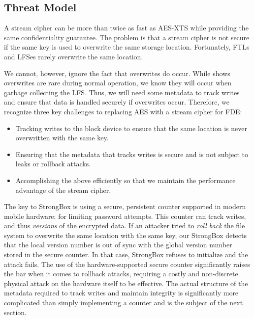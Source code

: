 \subsection{Threat Model}

A stream cipher can be more than twice as fast as AES-XTS while providing the
same confidentiality guarantee. The problem is that a stream cipher is not
secure if the same key is used to overwrite the same storage location.
Fortunately, FTLs and LFSes rarely overwrite the same location.

We cannot, however, ignore the fact that overwrites do occur. While
 shows overwrites are rare during normal operation, we know
they will occur when garbage collecting the LFS. Thus, we will need some
metadata to track writes and ensure that data is handled securely if overwrites
occur. Therefore, we recognize three key challenges to replacing AES with a
stream cipher for FDE:

\begin{itemize}

\item Tracking writes to the block device to ensure that the same location is
never overwritten with the same key.

\item Ensuring that the metadata that tracks writes is secure and is not
subject to leaks or rollback attacks.

\item Accomplishing the above efficiently so that we maintain the  performance
advantage of the stream cipher.

\end{itemize}

The key to StrongBox is using a secure, persistent counter supported in modern
mobile hardware; \eg for limiting password attempts. This counter can track
writes, and thus \emph{versions} of the encrypted data. If an attacker tried to
\emph{roll back} the file system to overwrite the same location with the same
key, our StrongBox detects that the local version number is out of sync with the
global version number stored in the secure counter. In that case, StrongBox
refuses to initialize and the attack fails. The use of the hardware-supported
secure counter significantly raises the bar when it comes to rollback attacks,
requiring a costly and non-discrete physical attack on the hardware itself to be
effective. The actual structure of the metadata required to track writes and
maintain integrity is significantly more complicated than simply implementing a
counter and is the subject of the next section.

